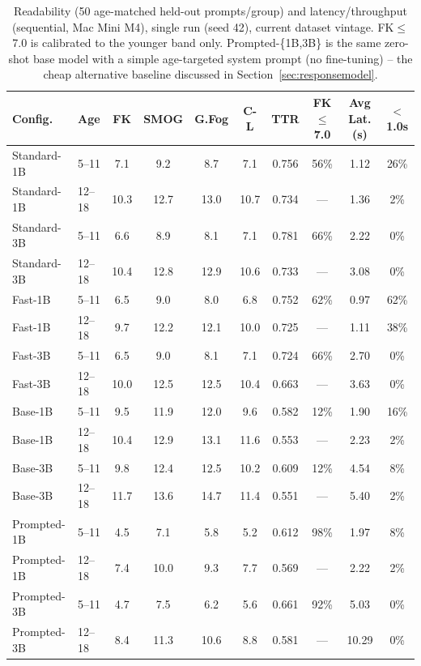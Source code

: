 \documentclass[pdflatex,sn-mathphys-num]{sn-jnl-official}%
\begin{document}
\begin{table}[!h]
  \caption{Readability (50 age-matched held-out prompts/group) and latency/throughput (sequential, Mac Mini M4), single run (seed 42), current dataset vintage. FK$\leq$7.0 is calibrated to the younger band only. Prompted-\{1B,3B\} is the same zero-shot base model with a simple age-targeted system prompt (no fine-tuning) -- the cheap alternative baseline discussed in Section~\ref{sec:responsemodel}.}
  \label{tab:res2}
  \scriptsize
  \setlength{\tabcolsep}{3pt}
  \begin{tabular}{@{}llcccccccc@{}}
    \toprule
    Config. & Age & FK & SMOG & G.Fog & C-L & TTR & FK$\leq$7.0 & Avg Lat.(s) & $<$1.0s \\
    \midrule
    Standard-1B & 5--11  & 7.1  & 9.2  & 8.7  & 7.1  & 0.756 & 56\% & 1.12 & 26\% \\
    Standard-1B & 12--18 & 10.3 & 12.7 & 13.0 & 10.7 & 0.734 & ---  & 1.36 & 2\%  \\
    Standard-3B & 5--11  & 6.6  & 8.9  & 8.1  & 7.1  & 0.781 & 66\% & 2.22 & 0\%  \\
    Standard-3B & 12--18 & 10.4 & 12.8 & 12.9 & 10.6 & 0.733 & ---  & 3.08 & 0\%  \\
    Fast-1B     & 5--11  & 6.5  & 9.0  & 8.0  & 6.8  & 0.752 & 62\% & 0.97 & 62\% \\
    Fast-1B     & 12--18 & 9.7  & 12.2 & 12.1 & 10.0 & 0.725 & ---  & 1.11 & 38\% \\
    Fast-3B     & 5--11  & 6.5  & 9.0  & 8.1  & 7.1  & 0.724 & 66\% & 2.70 & 0\%  \\
    Fast-3B     & 12--18 & 10.0 & 12.5 & 12.5 & 10.4 & 0.663 & ---  & 3.63 & 0\%  \\
    Base-1B     & 5--11  & 9.5  & 11.9 & 12.0 & 9.6  & 0.582 & 12\% & 1.90 & 16\% \\
    Base-1B     & 12--18 & 10.4 & 12.9 & 13.1 & 11.6 & 0.553 & ---  & 2.23 & 2\%  \\
    Base-3B     & 5--11  & 9.8  & 12.4 & 12.5 & 10.2 & 0.609 & 12\% & 4.54 & 8\%  \\
    Base-3B     & 12--18 & 11.7 & 13.6 & 14.7 & 11.4 & 0.551 & ---  & 5.40 & 2\%  \\
    Prompted-1B & 5--11  & 4.5  & 7.1  & 5.8  & 5.2  & 0.612 & 98\% & 1.97 & 8\%  \\
    Prompted-1B & 12--18 & 7.4  & 10.0 & 9.3  & 7.7  & 0.569 & ---  & 2.22 & 2\%  \\
    Prompted-3B & 5--11  & 4.7  & 7.5  & 6.2  & 5.6  & 0.661 & 92\% & 5.03 & 0\%  \\
    Prompted-3B & 12--18 & 8.4  & 11.3 & 10.6 & 8.8  & 0.581 & ---  & 10.29& 0\%  \\
    \bottomrule
  \end{tabular}
\end{table}
\end{document}
